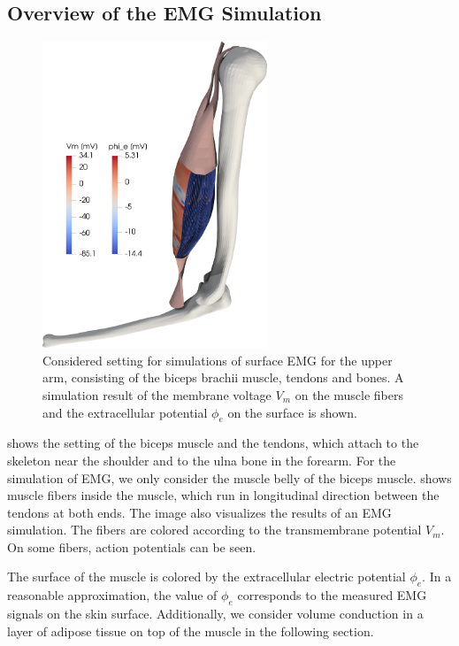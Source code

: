 \subsection{Overview of the EMG Simulation}\label{sec:overview_emg_simulation}

\begin{figure}
  \centering%
  \includegraphics[width=0.6\textwidth]{images/results/application/full_muscle_emg_raytrace_1_small.png}%
  \caption{Considered setting for simulations of surface EMG for the upper arm, consisting of the biceps brachii muscle, tendons and bones. A simulation result of the membrane voltage $V_m$ on the muscle fibers and the extracellular potential $\phi_e$ on the surface is shown.}%
  \label{fig:full_muscle_emg_raytrace_1}%
\end{figure}

 shows the setting of the biceps muscle and the tendons, which attach to the skeleton near the shoulder and to the ulna bone in the forearm. For the simulation of EMG, we only consider the muscle belly of the biceps muscle.  shows muscle fibers inside the muscle, which run in longitudinal direction between the tendons at both ends. The image also visualizes the results of an EMG simulation. The fibers are colored according to the transmembrane potential $V_m$. On some fibers, action potentials can be seen.

The surface of the muscle is colored by the  extracellular electric potential $\phi_e$. In a reasonable approximation, the value of $\phi_e$ corresponds to the measured EMG signals on the skin surface. 
Additionally, we consider volume conduction in a layer of adipose tissue on top of the muscle in the following section.

